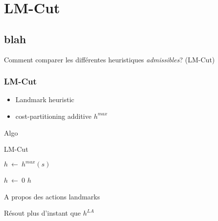 \section{LM-Cut}
  \subsection*{blah}

\begin{frame}
  \begin{block}{Comment comparer les différentes heuristiques \emph{admissibles}? (LM-Cut)}
      
    
  \end{block}
\end{frame}

\begin{frame}
  \frametitle{LM-Cut}

  \begin{block}{}
    \begin{itemize}
      \item Landmark heuristic
      \item cost-partitioning additive $h^{max}$
    \end{itemize}
  \end{block}

  \begin{block}{Algo}
    \begin{algorithm*}[H]
      \footnotesize
      \caption{LM-Cut}


      $h~←~h^{max}(s)$\;
      
      $h~←~0$\;
      \Return $h$\;


    \end{algorithm*}
  \end{block}
\end{frame}

\begin{frame}
  \begin{block}{A propos des actions landmarks}
    
  \end{block} 

  \begin{block}{}
    \begin{itemize}
      \proitem Résout plus d'instant que $h^{LA}$
    \end{itemize}
  \end{block}
\end{frame}

